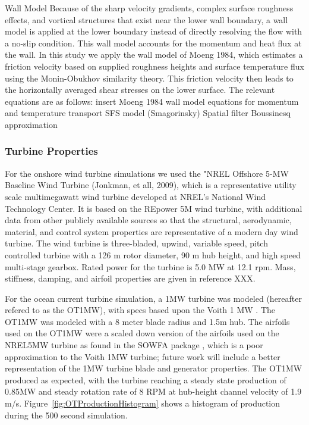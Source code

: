 \documentclass[12pt,letterpaper]{article}
\begin{document}
Wall Model
Because of the sharp velocity gradients, complex surface roughness effects, and vortical structures that exist near the lower wall boundary, a wall model is applied at the lower boundary instead of directly resolving the flow with a no-slip condition.  This wall model accounts for the momentum and heat flux at the wall.  In this study we apply the wall model of Moeng 1984, which estimates a friction velocity based on supplied roughness heights and surface temperature flux using the Monin-Obukhov similarity theory.  This friction velocity then leads to the horizontally averaged shear stresses on the lower surface.  The relevant equations are as follows:
insert Moeng 1984 wall model equations for momentum and temperature transport
SFS model (Smagorinsky)
Spatial filter
Boussinesq approximation

\subsubsection{Turbine Properties}
For the onshore wind turbine simulations we used the "NREL Offshore 5-MW Baseline Wind Turbine (Jonkman, et all, 2009), which is a representative utility scale multimegawatt wind turbine developed at NREL's National Wind Technology Center.  It is based on the REpower 5M wind turbine, with additional data from other publicly available sources so that the structural, aerodynamic, material, and control system properties are representative of a modern day wind turbine.  The wind turbine is three-bladed, upwind, variable speed, pitch controlled turbine with a 126 m rotor diameter, 90 m hub height, and high speed multi-stage gearbox.  Rated power for the turbine is 5.0 MW at 12.1 rpm.  Mass, stiffness, damping, and airfoil properties are given in reference XXX.

For the ocean current turbine simulation, a 1MW turbine was modeled (hereafter refered to as the OT1MW), with specs based upon the Voith 1 MW \cite{Voith}. The OT1MW was modeled with a 8 meter blade radius and 1.5m hub. The airfoils used on the OT1MW were a scaled down version of the airfoils used on the NREL5MW turbine as found in the SOWFA package \cite{SOWFA}, which is a poor approximation to the Voith 1MW turbine; future work will include a better representation of the 1MW turbine blade and generator properties. The OT1MW produced as expected, with the turbine reaching a steady state production of 0.85MW and steady rotation rate of 8 RPM at hub-height channel velocity of 1.9 m/s. Figure~\ref{fig:OTProductionHistogram} shows a histogram of production during the 500 second simulation.
\end{document}
